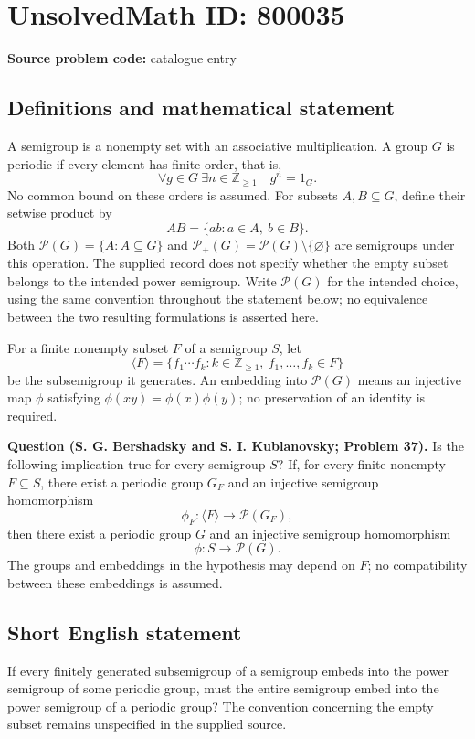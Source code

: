 \documentclass[11pt]{article}
\newcommand{\Z}{\mathbb{Z}}
\begin{document}
\section*{UnsolvedMath ID: 800035}
\textbf{Source problem code:} catalogue entry
\subsection{Definitions and mathematical statement}
A semigroup is a nonempty set with an associative multiplication. A group \(G\) is periodic if every element has finite order, that is,
\[
\forall g\in G\ \exists n\in\Z_{\geq 1}\quad g^n=1_G.
\]
No common bound on these orders is assumed. For subsets \(A,B\subseteq G\), define their setwise product by
\[
AB=\{ab:a\in A,\ b\in B\}.
\]
Both \(\mathcal P(G)=\{A:A\subseteq G\}\) and \(\mathcal P_+(G)=\mathcal P(G)\setminus\{\varnothing\}\) are semigroups under this operation. The supplied record does not specify whether the empty subset belongs to the intended power semigroup. Write \(\mathscr P(G)\) for the intended choice, using the same convention throughout the statement below; no equivalence between the two resulting formulations is asserted here.

For a finite nonempty subset \(F\) of a semigroup \(S\), let
\[
\langle F\rangle=\{f_1\cdots f_k:k\in\Z_{\geq1},\ f_1,\ldots,f_k\in F\}
\]
be the subsemigroup it generates. An embedding into \(\mathscr P(G)\) means an injective map \(\phi\) satisfying \(\phi(xy)=\phi(x)\phi(y)\); no preservation of an identity is required.

\textbf{Question (S. G. Bershadsky and S. I. Kublanovsky; Problem 37).} Is the following implication true for every semigroup \(S\)? If, for every finite nonempty \(F\subseteq S\), there exist a periodic group \(G_F\) and an injective semigroup homomorphism
\[
\phi_F:\langle F\rangle\longrightarrow\mathscr P(G_F),
\]
then there exist a periodic group \(G\) and an injective semigroup homomorphism
\[
\phi:S\longrightarrow\mathscr P(G).
\]
The groups and embeddings in the hypothesis may depend on \(F\); no compatibility between these embeddings is assumed.
\subsection{Short English statement}
If every finitely generated subsemigroup of a semigroup embeds into the power semigroup of some periodic group, must the entire semigroup embed into the power semigroup of a periodic group? The convention concerning the empty subset remains unspecified in the supplied source.
\end{document}

